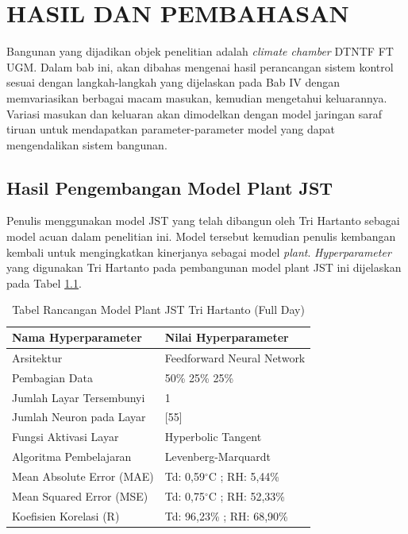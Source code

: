 \chapter{HASIL DAN PEMBAHASAN}
\label{hasil-dan-pembahasan}
Bangunan yang dijadikan objek penelitian adalah \textit{climate chamber} DTNTF FT UGM. Dalam bab ini, akan dibahas mengenai hasil perancangan sistem kontrol sesuai dengan langkah-langkah yang dijelaskan pada Bab IV dengan memvariasikan berbagai macam masukan, kemudian mengetahui keluarannya. Variasi masukan dan keluaran akan dimodelkan dengan model jaringan saraf tiruan untuk mendapatkan parameter-parameter model yang dapat mengendalikan sistem bangunan.

\section{Hasil Pengembangan Model Plant JST}

Penulis menggunakan model JST yang telah dibangun oleh Tri Hartanto\cite{skripsiTanto} sebagai model acuan dalam penelitian ini. Model tersebut kemudian penulis kembangan kembali untuk mengingkatkan kinerjanya sebagai model \textit{plant}. \textit{Hyperparameter} yang digunakan Tri Hartanto pada pembangunan model plant JST ini dijelaskan pada Tabel \ref{tbl:5:NNPlantTanto}.\\

\begin{table}[!h]
	\caption{Tabel Rancangan Model Plant JST Tri Hartanto (Full Day)}
	\label{tbl:5:NNPlantTanto}
	\centering
	\begin{tabular}{|p{5.7cm}|p{5cm}|}
		\hline
		\textbf{Nama Hyperparameter} & \textbf{Nilai Hyperparameter} \\ \hline
		Arsitektur & Feedforward Neural Network \\ \hline
		Pembagian Data & 50\% 25\% 25\% \\ \hline 
		Jumlah Layar Tersembunyi & 1 \\ \hline
		Jumlah Neuron pada Layar & [55] \\ \hline
		Fungsi Aktivasi Layar & Hyperbolic Tangent \\ \hline
		Algoritma Pembelajaran & Levenberg-Marquardt \\ \hline
		Mean Absolute Error (MAE) & Td: 0,59$^\circ$C ; RH: 5,44\% \\ \hline
		Mean Squared Error (MSE) & Td: 0,75$^\circ$C ; RH: 52,33\% \\ \hline
		Koefisien Korelasi (R) & Td: 96,23\% ; RH: 68,90\% \\ \hline
	\end{tabular}
\end{table}
\vspace{2em}

